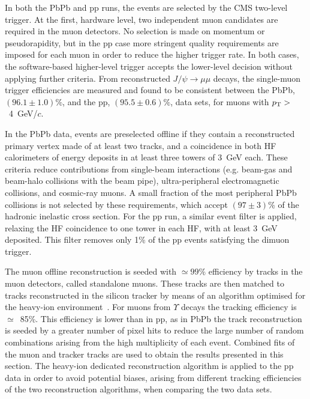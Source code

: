 In both the PbPb and pp runs, the events are selected by the CMS two-level trigger. At the first, hardware level, two independent muon candidates are 
required in the muon detectors. No selection is made on momentum or pseudorapidity, but in the pp case more stringent quality requirements are imposed 
for each muon in order to reduce the higher trigger rate. In both cases, the software-based higher-level trigger accepts the lower-level decision without 
applying further criteria. From reconstructed $J/\psi \rightarrow \mu\mu$ decays, the single-muon trigger efficiencies are measured and found to be consistent 
between the PbPb, $(96.1 \pm 1.0)\%$, and the pp, $(95.5 \pm 0.6)\%$, data sets, for muons with $p_{\rm T} >$~4~GeV/$c$.

In the PbPb data, events are preselected offline if they contain a reconstructed primary vertex made of at least two tracks, and a coincidence in both 
HF calorimeters of energy deposits in at least three towers of 3~GeV each. These criteria reduce contributions from single-beam interactions 
(e.g. beam-gas and beam-halo collisions with the beam pipe), ultra-peripheral electromagnetic collisions, and cosmic-ray muons. A small fraction of 
the most peripheral PbPb collisions is not selected by these requirements, which accept $(97 \pm 3)$\% of the hadronic inelastic 
cross section. For the pp run, a similar event filter is applied, relaxing the HF coincidence to one tower in each HF, with at least 3~GeV deposited. 
This filter removes only 1$\%$ of the pp events satisfying the dimuon trigger.

The muon offline reconstruction is seeded with $\simeq 99\%$ efficiency by tracks in the muon detectors, called standalone muons. 
These tracks are then matched to tracks reconstructed in the silicon tracker by means of an algorithm optimised for the 
heavy-ion environment~\cite{Roland:2006kz,D'Enterria:2007xr}. For muons from $\Upsilon$ decays the tracking efficiency is $\simeq$~85\%. 
This efficiency is lower than in pp, as in PbPb the track reconstruction is seeded by a greater number of pixel hits to reduce the large number 
of random combinations arising from the high multiplicity of each event. Combined fits of the muon and tracker tracks are used to obtain the 
results presented in this section. The heavy-ion dedicated reconstruction algorithm is applied to the pp data in order to avoid potential biases, 
arising from different tracking efficiencies of the two reconstruction algorithms, when comparing the two data sets.

